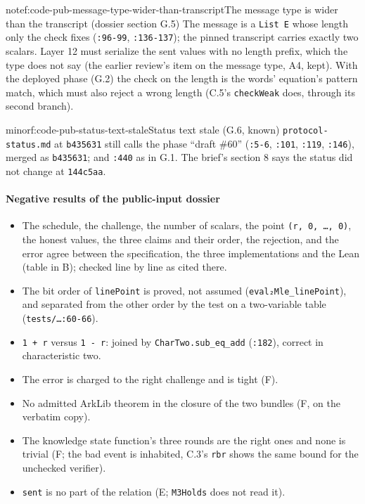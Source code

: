 \begin{finding}{note}{f:code-pub-message-type-wider-than-transcript}{The message type is wider than the transcript (dossier section G.5)}
The message is a \texttt{List E} whose length only the check fixes (\texttt{:96-{}99}, \texttt{:136-{}137}); the pinned transcript carries exactly two scalars. Layer 12 must serialize the sent values with no length prefix, which the type does not say (the earlier review's item on the message type, A4, kept). With the deployed phase (G.2) the check on the length is the words' equation's pattern match, which must also reject a wrong length (C.5's \texttt{checkWeak} does, through its second branch).

\end{finding}

\begin{finding}{minor}{f:code-pub-status-text-stale}{Status text stale (G.6, known)}
\texttt{protocol-{}status.\allowbreak{}md} at \texttt{b435631} still calls the phase \enquote{draft \#60} (\texttt{:5-{}6}, \texttt{:101}, \texttt{:119}, \texttt{:146}), merged as \texttt{b435631}; and \texttt{:440} as in G.1. The brief's section 8 says the status did not change at \texttt{144c5aa}.

\end{finding}

\paragraph*{Negative results of the public-input dossier}

\begin{itemize}
\item The schedule, the challenge, the number of scalars, the point \texttt{(\allowbreak{}r,\allowbreak{} 0,\allowbreak{} …,\allowbreak{} 0)}, the honest values, the three claims and their order, the rejection, and the error agree between the specification, the three implementations and the Lean (table in B); checked line by line as cited there.
\item The bit order of \texttt{linePoint} is proved, not assumed (\texttt{eval₂Mle\_\allowbreak{}linePoint}), and separated from the other order by the test on a two-variable table (\texttt{tests/\allowbreak{}…:60-{}66}).
\item \texttt{1 + r} versus \texttt{1 -{} r}: joined by \texttt{CharTwo.\allowbreak{}sub\_\allowbreak{}eq\_\allowbreak{}add} (\texttt{:182}), correct in characteristic two.
\item The error is charged to the right challenge and is tight (F).
\item No admitted ArkLib theorem in the closure of the two bundles (F, on the verbatim copy).
\item The knowledge state function's three rounds are the right ones and none is trivial (F; the bad event is inhabited, C.3's \texttt{rbr\textquotesingle{}} shows the same bound for the unchecked verifier).
\item \texttt{sent} is no part of the relation (E; \texttt{M3Holds} does not read it).
\end{itemize}

